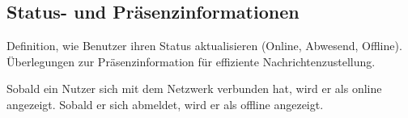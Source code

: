 \subsection{Status- und Präsenzinformationen}

Definition, wie Benutzer ihren Status aktualisieren (Online, Abwesend, Offline).
Überlegungen zur Präsenzinformation für effiziente Nachrichtenzustellung.

Sobald ein Nutzer sich mit dem Netzwerk verbunden hat, wird er als online angezeigt.
Sobald er sich abmeldet, wird er als offline angezeigt.